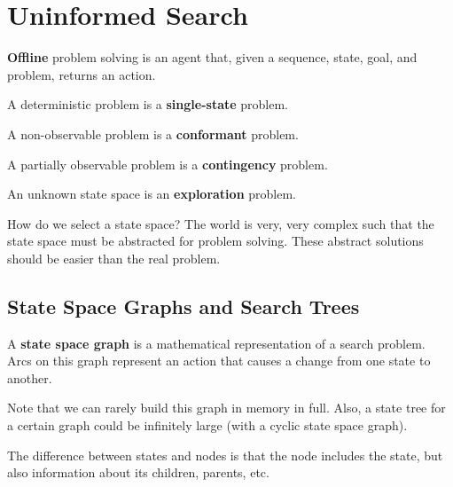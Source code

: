 
\section{Uninformed Search}

\begin{definition}
	\textbf{Offline} problem solving is an agent that, given a sequence, state, goal, and problem, returns an action.
\end{definition}

\begin{definition}
	A deterministic problem is a \textbf{single-state} problem.
\end{definition}

\begin{definition}
	A non-observable problem is a \textbf{conformant} problem.
\end{definition}

\begin{definition}
	A partially observable problem is a \textbf{contingency} problem.
\end{definition}

\begin{definition}
	An unknown state space is an \textbf{exploration} problem.
\end{definition}

How do we select a state space? The world is very, very complex such that the state space must be abstracted for problem solving. These abstract solutions should be easier than the real problem.

\subsection{State Space Graphs and Search Trees}

\begin{definition}
	A \textbf{state space graph} is a mathematical representation of a search problem. Arcs on this graph represent an action that causes a change from one state to another.
\end{definition}

Note that we can rarely build this graph in memory in full. Also, a state tree for a certain graph could be infinitely large (with a cyclic state space graph).

The difference between states and nodes is that the node includes the state, but also information about its children, parents, etc.
